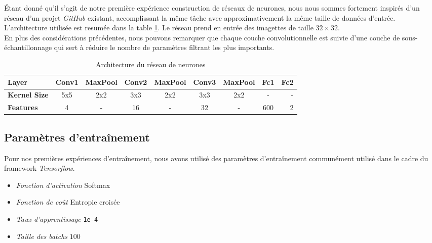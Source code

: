 \documentclass[a4paper,11pt]{article}
\begin{document}
    Étant donné qu'il s'agit de notre première expérience construction de réseaux de neurones, nous nous sommes fortement inspirés d'un réseau d'un projet \textit{GitHub} \cite{face_detect} existant, accomplissant la même tâche avec approximativement la même taille de données d'entrée.
    \\
    L'architecture utilisée est resumée dans la table \ref{tab:network_architecture}. Le réseau prend en entrée des imagettes de taille $32\times32$.
    \\
    En plus des considérations précédentes, nous pouvons remarquer que chaque couche convolutionnelle est suivie d'une couche de sous-échantillonnage qui sert à réduire le nombre de paramètres filtrant les plus importants.
    \begin{table}
        \begin{tabular}{|l|c|c|c|c|c|c|c|r|}
            
            \hline
            \textbf{Layer} & Conv1 & MaxPool & Conv2 & MaxPool & Conv3 & MaxPool & Fc1 & Fc2 \\
            \hline
            \textbf{Kernel Size} & 5x5 & 2x2 & 3x3 & 2x2 & 3x3 & 2x2 & -  & - \\
            \textbf{Features} & 4 & - & 16 & - & 32 & - & 600  & 2 \\
            \hline
        \end{tabular}
        \caption{Architecture du réseau de neurones}
        \label{tab:network_architecture}
    \end{table}

\subsection{Paramètres d'entraînement}

    Pour nos premières expériences d'entraînement, nous avons utilisé des paramètres d'entraînement communément utilisé dans le cadre du framework \textit{Tensorflow}.
    \begin{itemize}
        \item{\textit{Fonction d'activation}} Softmax
        \item{\textit{Fonction de coût}} Entropie croisée
        \item{\textit{Taux d'apprentissage}} \verb$1e-4$
        \item{\textit{Taille des batchs}} $100$
    \end{itemize}
\end{document}
